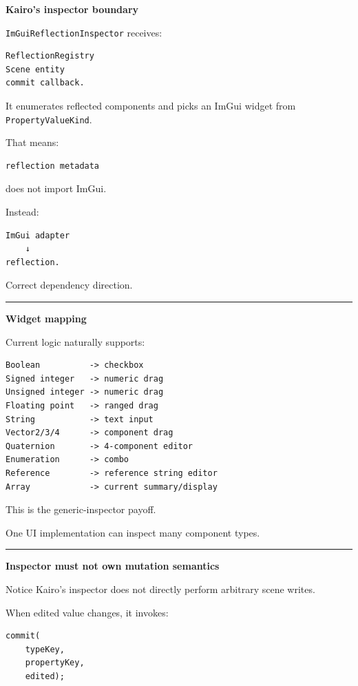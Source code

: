 \textbf{Kairo's inspector boundary}

\texttt{ImGuiReflectionInspector} receives:

\begin{verbatim}
ReflectionRegistry
Scene entity
commit callback.
\end{verbatim}

It enumerates reflected components and picks an ImGui widget from \texttt{PropertyValueKind}.

That means:

\begin{verbatim}
reflection metadata
\end{verbatim}

does not import ImGui.

Instead:

\begin{verbatim}
ImGui adapter
    ↓
reflection.
\end{verbatim}

Correct dependency direction.

\begin{center}\rule{0.5\linewidth}{0.5pt}\end{center}

\textbf{Widget mapping}

Current logic naturally supports:

\begin{verbatim}
Boolean          -> checkbox
Signed integer   -> numeric drag
Unsigned integer -> numeric drag
Floating point   -> ranged drag
String           -> text input
Vector2/3/4      -> component drag
Quaternion       -> 4-component editor
Enumeration      -> combo
Reference        -> reference string editor
Array            -> current summary/display
\end{verbatim}

This is the generic-inspector payoff.

One UI implementation can inspect many component types.

\begin{center}\rule{0.5\linewidth}{0.5pt}\end{center}

\textbf{Inspector must not own mutation semantics}

Notice Kairo's inspector does not directly perform arbitrary scene writes.

When edited value changes, it invokes:

\begin{verbatim}
commit(
    typeKey,
    propertyKey,
    edited);
\end{verbatim}

